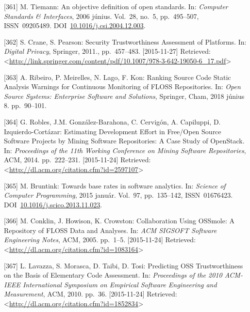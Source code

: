 \documentclass[12pt,magyar,a4paper,oneside]{scrreprt}
\begin{document}
\leavevmode\hypertarget{ref-tiemann_objective_2006}{}%
{[}361{]} M. Tiemann: An objective definition of open standards. In:
\emph{Computer Standards \& Interfaces}, 2006 június. Vol.~28, no.~5,
pp.~495--507, ISSN~09205489.
DOI~\href{https://doi.org/10.1016/j.csi.2004.12.003}{10.1016/j.csi.2004.12.003}.

\leavevmode\hypertarget{ref-crane_security_2011}{}%
{[}362{]} S. Crane, S. Pearson: Security Trustworthiness Assessment of
Platforms. In: \emph{Digital Privacy}, Springer, 2011., pp.~457--483.
{[}2015-11-27{]} Retrieved:
\textless{}\url{http://link.springer.com/content/pdf/10.1007/978-3-642-19050-6_17.pdf}\textgreater{}

\leavevmode\hypertarget{ref-ribeiro_ranking_2018}{}%
{[}363{]} A. Ribeiro, P. Meirelles, N. Lago, F. Kon: Ranking Source Code
Static Analysis Warnings for Continuous Monitoring of FLOSS
Repositories. In: \emph{Open Source Systems: Enterprise Software and
Solutions}, Springer, Cham, 2018 június 8. pp.~90--101.

\leavevmode\hypertarget{ref-robles_estimating_2014}{}%
{[}364{]} G. Robles, J.M. González-Barahona, C. Cervigón, A. Capiluppi,
D. Izquierdo-Cortázar: Estimating Development Effort in Free/Open Source
Software Projects by Mining Software Repositories: A Case Study of
OpenStack. In: \emph{Proceedings of the 11th Working Conference on
Mining Software Repositories}, ACM, 2014. pp.~222--231. {[}2015-11-24{]}
Retrieved:
\textless{}\url{http://dl.acm.org/citation.cfm?id=2597107}\textgreater{}

\leavevmode\hypertarget{ref-bruntink_towards_2015}{}%
{[}365{]} M. Bruntink: Towards base rates in software analytics. In:
\emph{Science of Computer Programming}, 2015 január. Vol.~97,
pp.~135--142, ISSN~01676423.
DOI~\href{https://doi.org/10.1016/j.scico.2013.11.023}{10.1016/j.scico.2013.11.023}.

\leavevmode\hypertarget{ref-conklin_collaboration_2005}{}%
{[}366{]} M. Conklin, J. Howison, K. Crowston: Collaboration Using
OSSmole: A Repository of FLOSS Data and Analyses. In: \emph{ACM SIGSOFT
Software Engineering Notes}, ACM, 2005. pp.~1--5. {[}2015-11-24{]}
Retrieved:
\textless{}\url{http://dl.acm.org/citation.cfm?id=1083164}\textgreater{}

\leavevmode\hypertarget{ref-lavazza_predicting_2010}{}%
{[}367{]} L. Lavazza, S. Morasca, D. Taibi, D. Tosi: Predicting OSS
Trustworthiness on the Basis of Elementary Code Assessment. In:
\emph{Proceedings of the 2010 ACM-IEEE International Symposium on
Empirical Software Engineering and Measurement}, ACM, 2010. pp.~36.
{[}2015-11-24{]} Retrieved:
\textless{}\url{http://dl.acm.org/citation.cfm?id=1852834}\textgreater{}
\end{document}
